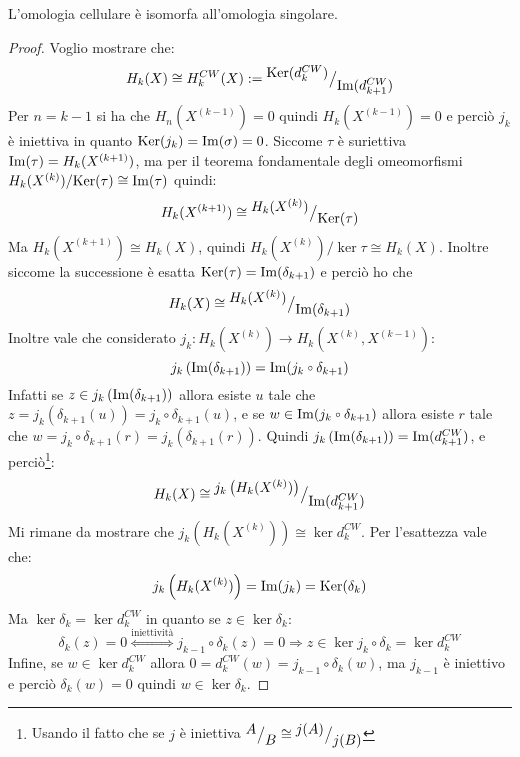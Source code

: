 \begin{proposition}
  L'omologia cellulare è isomorfa all'omologia singolare.
\end{proposition}
\begin{proof}
  Voglio mostrare che:
  \[
    H_k(X) \cong H^{CW}_k(X) := {^{\textstyle \mathrm{Ker}( d_k^{CW})}\big/_{\textstyle \mathrm{Im}( d_{k+1}^{CW} )}}
  \]
  Per $ n = k - 1 $ si ha che $ H_n(X^{(k-1)}) = 0 $ quindi $ H_k(X^{(k-1)}) = 0 $ e
  perciò $ j_k $ è iniettiva in quanto $ \mathrm{Ker}( j_k) = \mathrm{Im}( \sigma ) = 0 $.
  Siccome $ \tau $ è suriettiva $ \mathrm{Im}( \tau ) = H_k(X^{(k+1)}) $, ma per il
  teorema fondamentale degli omeomorfismi
  $ {H_k(X^{(k)})} \slash {\mathrm{Ker}( \tau)} \cong \mathrm{Im}( \tau ) $ quindi:
  \[
    H_k(X^{(k+1)}) \cong {^{\textstyle H_k(X^{(k)})}\big/_{\textstyle \mathrm{Ker}( \tau)}}
  \]
  Ma $ H_k(X^{(k+1)}) \cong H_k(X) $, quindi
  $ {H_k(X^{(k)})} \slash {\ker{\tau}} \cong H_k(X) $. Inoltre siccome la successione è
  esatta $ \mathrm{Ker}( \tau) = \mathrm{Im}( \delta_{k+1} ) $ e perciò ho che
  \[
    H_k(X) \cong {^{\textstyle H_k(X^{(k)})}\big/_{\textstyle \mathrm{Im}( \delta_{k+1} )}}
  \]
  Inoltre vale che considerato $ j_k \colon H_k(X^{(k)}) \to H_k(X^{(k)}, X^{(k-1)}) $:
  \[
    j_k\left(\im{\delta_{k+1}}\right) = \im{j_k \circ \delta_{k+1}}
  \]
  Infatti se $ z \in j_k\left(\mathrm{Im}( \delta_{k+1} )\right) $ allora esiste $ u $ tale che
  $ z = j_k(\delta_{k+1}(u)) = j_k \circ \delta_{k+1}(u) $, e se $ w \in \im{j_k \circ \delta_{k+1}} $ allora esiste $ r $ tale che
  $ w = j_k \circ \delta_{k+1}(r) = j_k(\delta_{k+1}(r)) $.
  Quindi $ j_k\left(\mathrm{Im}( \delta_{k+1} )\right) = \mathrm{Im}( d_{k+1}^{CW} ) $, e perciò\footnote{Usando il fatto che se
  $ j $ è iniettiva $ {^{\textstyle A}\big/_{\textstyle B}} \cong {^{\textstyle j(A)}\big/_{\textstyle j(B)}} $}:
  \[
    H_k(X) \cong {^{\textstyle j_k\left(H_k(X^{(k)})\right)}\big/_{\textstyle \mathrm{Im}( d^{CW}_{k+1} )}}
  \]
  Mi rimane da mostrare che $ j_k\left(H_k(X^{(k)})\right) \cong \ker{d_k^{CW}} $.
  Per l'esattezza vale che:
  \[
    j_k\left(H_k(X^{(k)})\right) = \mathrm{Im}( j_k ) = \mathrm{Ker}( \delta_k)
  \]
  Ma $ \ker{\delta_k} = \ker{d_k^{CW}} $ in quanto se $ z \in \ker{\delta_k} $:
  \[
    \delta_k(z) = 0 \overset{\text{iniettività}}{\iff} j_{k-1} \circ \delta_k(z) = 0 \Rightarrow z \in \ker{j_k \circ \delta_k} = \ker{d_k^{CW}}
  \]
  Infine, se $ w \in \ker{d_k^{CW}} $ allora $ 0 = d_k^{CW}(w) = j_{k-1} \circ \delta_k (w) $,
  ma $ j_{k-1} $ è iniettivo e perciò $ \delta_k(w) = 0 $ quindi $ w \in \ker{\delta_k} $.
\end{proof}


